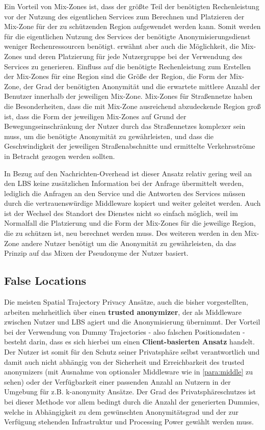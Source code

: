 Ein Vorteil von Mix-Zones ist, dass der größte Teil der benötigten Rechenleistung vor der Nutzung des eigentlichen Services zum Berechnen und Platzieren der Mix-Zone für der zu schützenden Region aufgewendet werden kann. Somit werden für die eigentlichen Nutzung des Services der benötigte Anonymisierungsdienst weniger Rechenressourcen benötigt. \cite{Beresford2003} erwähnt aber auch die Möglichkeit, die Mix-Zones und deren Platzierung für jede Nutzergruppe bei der Verwendung des Services zu generieren. Einfluss auf die benötigte Rechenleistung zum Erstellen der Mix-Zones für eine Region sind die Größe der Region, die Form der Mix-Zone, der Grad der benötigten Anonymität und die erwartete mittlere Anzahl der Benutzer innerhalb der jeweiligen Mix-Zone. Mix-Zones für Straßennetze haben die Besonderheiten, dass die mit Mix-Zone ausreichend abzudeckende Region groß ist, dass die Form der jeweiligen Mix-Zones auf Grund der Bewegungseinschränkung der Nutzer durch das Straßennetzes komplexer sein muss, um die benötigte Anonymität zu gewährleisten, und dass die Geschwindigkeit der jeweiligen Straßenabschnitte und ermittelte Verkehrsströme in Betracht gezogen werden sollten. 

In Bezug auf den Nachrichten-Overhead ist dieser Ansatz relativ gering weil an den LBS keine zusätzlichen Information bei der Anfrage übermittelt werden, lediglich die Anfragen an den Service und die Antworten des Services müssen durch die vertrauenswürdige Middleware kopiert und weiter geleitet werden. Auch ist der Wechsel des Standort des Dienstes nicht so einfach möglich, weil im Normalfall die Platzierung und die Form der Mix-Zones für die jeweilige Region, die zu schützen ist, neu berechnet werden muss. Des weiteren werden in den Mix-Zone andere Nutzer benötigt um die Anonymität zu gewährleisten, da das Prinzip auf das Mixen der Pseudonyme der Nutzer basiert. 

\subsection{False Locations}
Die meisten Spatial Trajectory Privacy Ansätze, auch die bisher vorgestellten, arbeiten mehrheitlich über einen \textbf{trusted anonymizer}, der als Middleware zwischen Nutzer und LBS agiert und die Anonymisierung übernimmt. Der Vorteil bei der Verwendung von Dummy Trajectories - also falschen Positionsdaten - besteht darin, dass es sich hierbei um einen \textbf{Client-basierten Ansatz} handelt. Der Nutzer ist somit für den Schutz seiner Privatsphäre selbst verantwortlich und damit auch nicht abhängig von der Sicherheit und Erreichbarkeit des trusted anonymizers (mit Ausnahme von optionaler Middleware wie in \ref{para:middle} zu sehen) oder der Verfügbarkeit einer passenden Anzahl an Nutzern in der Umgebung für z.B. k-anonymity Ansätze. Der Grad des Privatsphäreschutzes ist bei dieser Methode vor allem bedingt durch die Anzahl der generierten Dummies, welche in Abhängigkeit zu dem gewünschten Anonymitätsgrad und der zur Verfügung stehenden Infrastruktur und Processing Power gewählt werden muss.

